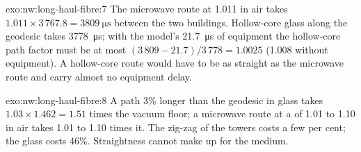 \begin{solution}{exo:nw:long-haul-fibre:7}
The microwave route at 1.011 in air takes $1.011 \times 3\,767.8 = \qty{3809}{\micro\second}$ between the two buildings. Hollow-core glass along
the geodesic takes \qty{3778}{\micro\second}; with the model's \qty{21.7}{\micro\second} of equipment the hollow-core path factor must be at most
$(3\,809 - 21.7)/3\,778 = 1.0025$ (1.008 without equipment). A hollow-core route would have to be as straight as the microwave route and
carry almost no equipment delay.
\end{solution}

\begin{solution}{exo:nw:long-haul-fibre:8}
A path 3\% longer than the geodesic in glass takes $1.03 \times 1.462 = 1.51$ times the vacuum floor; a microwave route at a  of 1.01
to 1.10 in air takes 1.01 to 1.10 times it. The zig-zag of the towers costs a few per cent; the glass costs 46\%. Straightness cannot make up
for the medium.
\end{solution}

